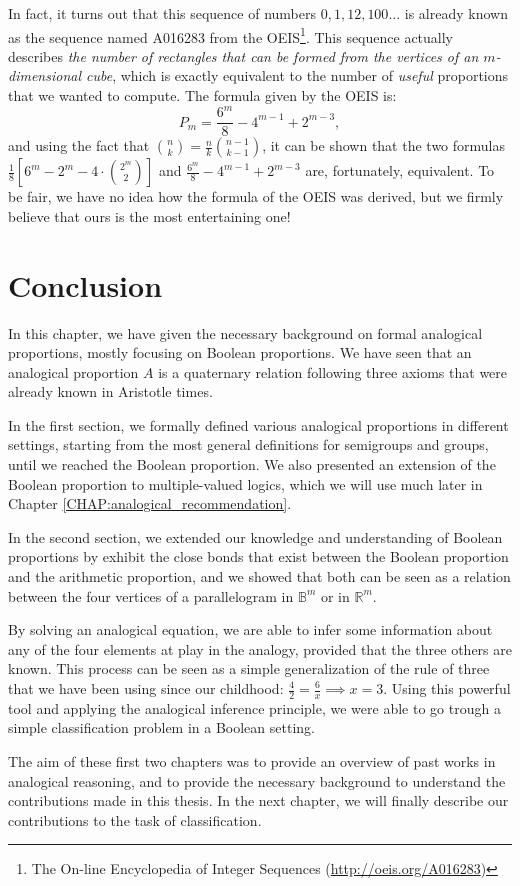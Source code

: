 In fact, it turns out that this sequence of numbers $0, 1, 12, 100\dots$ is
already known as the sequence named A016283 from the OEIS\footnote{The On-line
Encyclopedia of Integer Sequences (\url{http://oeis.org/A016283})}.
This sequence actually describes \textit{the number of rectangles that can be
formed from the vertices of an $m$-dimensional cube}, which is exactly
equivalent to the number of \textit{useful} proportions that we wanted to
compute. The formula given by the OEIS is:
$$P_m = \frac{6^m}{8} - 4^{m - 1} + 2^{m - 3},$$
and using the fact that $\binom{n}{k} = \frac{n}{k}\binom{n - 1}{k - 1}$, it
can be shown that the two formulas $\frac{1}{8} \left[6^m - 2^m -
4\cdot\binom{2^m}{2} \right]$ and $\frac{6^m}{8} - 4^{m - 1} + 2^{m- 3}$ are,
fortunately, equivalent.  To be fair, we have no idea how the formula of the
OEIS was derived, but we firmly believe that ours is the most entertaining one!

\section*{Conclusion}

In this chapter, we have given the necessary background on formal analogical
proportions, mostly focusing on Boolean proportions. We have seen that an
analogical proportion $A$ is a quaternary relation following three axioms that
were already known in Aristotle times.

In the first section, we formally defined various analogical proportions in different settings,
starting from the most general definitions for semigroups and groups, until we
reached the Boolean proportion. We also presented an extension of the Boolean
proportion to multiple-valued logics, which we will use much later in Chapter
\ref{CHAP:analogical_recommendation}.

In the second section, we extended our knowledge and understanding of Boolean
proportions by exhibit the close bonds that exist between the Boolean
proportion and the arithmetic proportion, and we showed that both can be seen
as a relation between the four vertices of a parallelogram in $\mathbb{B}^m$ or
in $\mathbb{R}^m$.

By solving an analogical equation, we are able to infer some information about
any of the four elements at play in the analogy, provided that the three others
are known. This process can be seen as a simple generalization of the rule of
three that we have been using since our childhood: $\frac{4}{2} = \frac{6}{x}
\implies x = 3$. Using this powerful tool and applying the analogical inference
principle, we were able to go trough a simple classification problem in a
Boolean setting.

The aim of these first two chapters was to provide an overview of past works in
analogical reasoning, and to provide the necessary background to understand the
contributions made in this thesis. In the next chapter, we will finally
describe our contributions to the task of classification.
